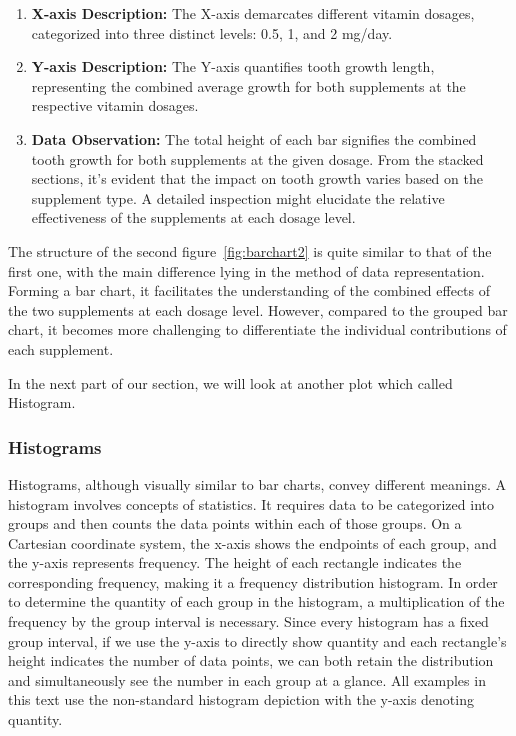 \documentclass{article}\usepackage[]{graphicx}\usepackage[]{xcolor}
\begin{document}
\begin{enumerate}
    \item \textbf{X-axis Description:} The X-axis demarcates different vitamin dosages, categorized into three distinct levels: 0.5, 1, and 2 mg/day.
    
    \item \textbf{Y-axis Description:} The Y-axis quantifies tooth growth length, representing the combined average growth for both supplements at the respective vitamin dosages.
    \item \textbf{Data Observation:} The total height of each bar signifies the combined tooth growth for both supplements at the given dosage. From the stacked sections, it's evident that the impact on tooth growth varies based on the supplement type. A detailed inspection might elucidate the relative effectiveness of the supplements at each dosage level.
\end{enumerate}
The structure of the second figure~\ref{fig:barchart2} is quite similar to that of the first one, with the main difference lying in the method of data representation. Forming a bar chart, it facilitates the understanding of the combined effects of the two supplements at each dosage level. However, compared to the grouped bar chart, it becomes more challenging to differentiate the individual contributions of each supplement.

In the next part of our section, we will look at another plot which called Histogram.
\subsubsection{Histograms}
Histograms, although visually similar to bar charts, convey different meanings. A histogram involves concepts of statistics. It requires data to be categorized into groups and then counts the data points within each of those groups. On a Cartesian coordinate system, the x-axis shows the endpoints of each group, and the y-axis represents frequency. The height of each rectangle indicates the corresponding frequency, making it a frequency distribution histogram. In order to determine the quantity of each group in the histogram, a multiplication of the frequency by the group interval is necessary. Since every histogram has a fixed group interval, if we use the y-axis to directly show quantity and each rectangle's height indicates the number of data points, we can both retain the distribution and simultaneously see the number in each group at a glance. All examples in this text use the non-standard histogram depiction with the y-axis denoting quantity.
\end{document}
